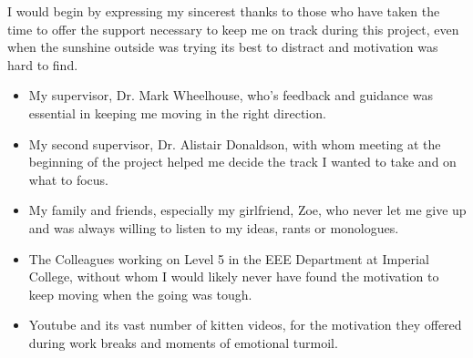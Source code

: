 
\cleardoublepage


\begin{acknowledgements}

I would begin by expressing my sincerest thanks to those who have taken the time to offer the support necessary to keep me on track during this project, even when the sunshine outside was trying its best to distract and motivation was hard to find.

\begin{itemize}
	 \item My supervisor, Dr. Mark Wheelhouse, who's feedback and guidance was essential in keeping me moving in the right direction.
	 \vspace*{3mm}
	 \item My second supervisor, Dr. Alistair Donaldson, with whom meeting at the beginning of the project helped me decide the track I wanted to take and on what to focus.
	 \vspace*{3mm}
	 \item My family and friends, especially my girlfriend, Zoe, who never let me give up and was always willing to listen to my ideas, rants or monologues.
	 \vspace*{3mm}
	 \item The Colleagues working on Level 5 in the EEE Department at Imperial College, without whom I would likely never have found the motivation to keep moving when the going was tough.
	 \vspace*{3mm}
	\item Youtube and its vast number of kitten videos, for the motivation they offered during work breaks and moments of emotional turmoil.

\end{itemize}

\end{acknowledgements}

